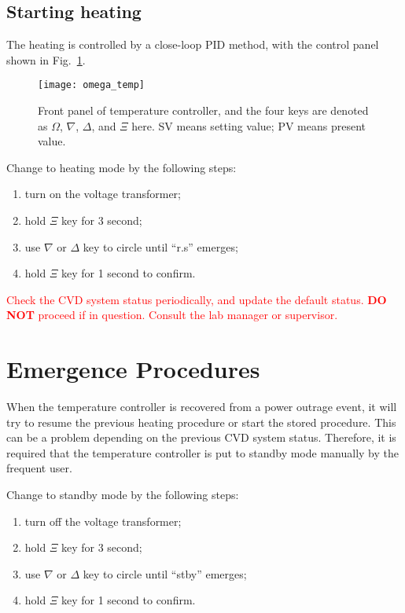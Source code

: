 \subsection{Starting heating} 
The heating is controlled by a close-loop PID method, with the control panel shown in Fig.~\ref{fig:omega}. 
\begin{figure}[htb]
\centering
\texttt{[image: omega\_temp]}
\caption{Front panel of temperature controller, and the four keys are denoted as $\Omega$, $\nabla$, $\Delta$, and $\Xi$ here. SV means setting value; PV means present value.}
\label{fig:omega}
\end{figure}

Change to heating mode by the following steps:
\begin{enumerate}
\item turn on the voltage transformer; 
\item hold $\Xi$ key for 3 second;
\item use $\nabla$ or $\Delta$ key to circle until ``r.s'' emerges;
\item hold $\Xi$ key for 1 second to confirm.
\end{enumerate}


\textcolor{red}{Check the CVD system status periodically, and update the default status. \textbf{DO NOT} proceed if in question. Consult the lab manager or supervisor.}


\section{Emergence Procedures}

When the temperature controller is recovered from a power outrage event, it will try to resume the previous heating procedure or start the stored procedure. This can be a problem depending on the previous CVD system status. Therefore, it is required that the temperature controller is put to standby mode manually by the frequent user. 

Change to standby mode by the following steps:
\begin{enumerate}
\item turn off the voltage transformer; 
\item hold $\Xi$ key for 3 second;
\item use $\nabla$ or $\Delta$ key to circle until ``stby'' emerges;
\item hold $\Xi$ key for 1 second to confirm.
\end{enumerate}

